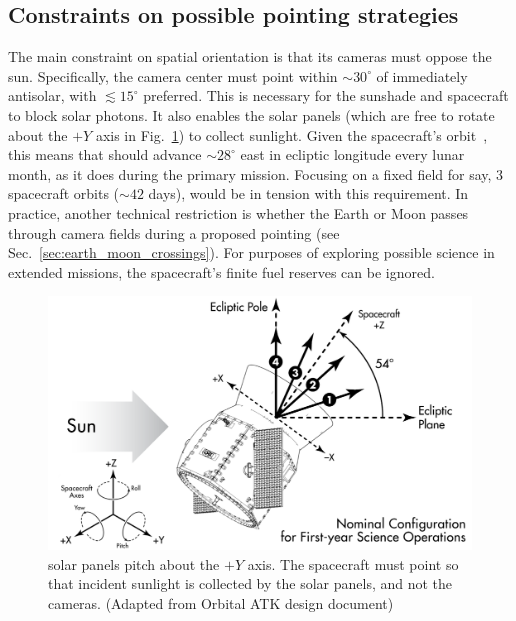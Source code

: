 \subsection{Constraints on possible pointing strategies}
\label{sec:constraints_on_pointings}
The main constraint on \tesss spatial orientation is that its cameras must oppose the sun.
Specifically, the camera center must point within $\sim30^\circ$ of immediately antisolar, with $\lesssim15^\circ$ preferred.
This is necessary for the sunshade and spacecraft to block solar photons.
It also enables the solar panels (which are free to rotate about the $+Y$ axis in Fig.~\ref{fig:spacecraft_angles}) to collect sunlight.
Given the spacecraft's orbit~\citep{gangestad_high_2013}, this means that \tess should advance $\sim28^\circ$ east in ecliptic longitude every lunar month, as it does during the primary mission.
Focusing on a fixed field for say, 3 spacecraft orbits ($\sim42$ days), would be in tension with this requirement.
In practice, another technical restriction is whether the Earth or Moon passes through \tesss camera fields during a proposed pointing (see Sec.~\ref{sec:earth_moon_crossings}).
For purposes of exploring possible science in extended missions, the spacecraft's finite fuel reserves can be ignored.

\begin{figure}[t] %
	\centering
	\includegraphics{figures/spacecraft_angles.pdf}
	\caption{\tesss solar panels pitch about the $+Y$ axis. The spacecraft must point so that incident sunlight is collected by the solar panels, and not the cameras. (Adapted from Orbital ATK design document) }
	\label{fig:spacecraft_angles}
\end{figure}